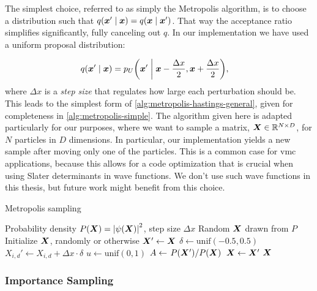 \documentclass[Thesis.tex]{subfiles}
\begin{document}
The simplest choice, referred to as simply the Metropolis algorithm, is to
choose a distribution such that
$q\qty(\bm{x}'\;\middle|\;\bm{x})=q\qty(\bm{x}\;\middle|\;\bm{x}')$. That way the acceptance
ratio simplifies significantly, fully canceling out $q$. In our implementation
we have used a uniform proposal distribution:

\begin{align}
  q\qty(\bm{x}' \;\middle|\; \bm{x}) &= p_U\qty(\bm{x}' \;\middle|\; \bm{x} -\frac{\Delta x}{2}, \bm{x} + \frac{\Delta x}{2}),
\end{align}
where $\Delta x$ is a \emph{step size} that regulates how large each
perturbation should be. This leads to the simplest form of
\cref{alg:metropolis-hastings-general}, given for completeness in
\cref{alg:metropolis-simple}. The algorithm given here is adapted particularly
for our purposes, where we want to sample a matrix, $\bm{X}\in\mathbb{R}^{N\times D}$, for $N$ particles in $D$ dimensions. In particular,
our implementation yields a new sample after moving only one of the particles.
This is a common case for \gls{vmc} applications, because this allows for a code
optimization that is crucial when using Slater determinants in wave functions.
We don't use such wave functions in this thesis, but future work might benefit
from this choice.

\begin{algorithm}[h]
    \caption{Metropolis sampling}
    \label{alg:metropolis-simple}
    \begin{algorithmic}[1]
        \Require Probability density $P(\bm{X})=\abs{\psi(\bm{X})}^2$, step size $\Delta x$
        \Ensure Random $\bm{X}$ drawn from $P$
        \State Initialize $\bm{X}$, randomly or otherwise
        \Repeat
            \State $\bm{X}'\gets \bm{X}$
              \State $\delta\gets \text{unif}(-0.5, 0.5)$
              \State $X_{i,d}'\gets X_{i,d} + \Delta x \cdot \delta$
            \EndFor
            \State $u\gets\text{unif}(0, 1)$
            \State $A\gets \flatfrac{P\qty(\vX')}{P\qty(\vX)}$
              \State $\bm{X} \gets \bm{X}'$
            \EndIf
            \State \Yield $\bm{X}$
          \EndFor
    \end{algorithmic}
\end{algorithm}

\subsubsection{Importance Sampling}
\end{document}
